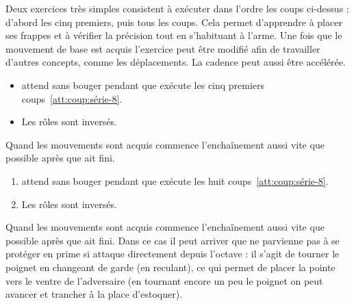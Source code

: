 Deux exercices très simples consistent à exécuter dans l'ordre les coups ci-dessus : d'abord les cinq premiers, puis tous les coups.
Cela permet d'apprendre à placer ses frappes et à vérifier la précision tout en s'habituant à l'arme.
Une fois que le mouvement de base est acquis l'exercice peut être modifié afin de travailler d'autres concepts, comme les déplacements.
La cadence peut aussi être accélérée.


\begin{exercice}
	\label{att:ex:série-5}


	\begin{itemize}
		\item \D attend sans bouger pendant que \A exécute les cinq premiers coups~\ref{att:coup:série-8}.
		
		\item Les rôles sont inversés.
	\end{itemize}

	Quand les mouvements sont acquis \D commence l'enchaînement aussi vite que possible après que \A ait fini.
\end{exercice}


\begin{exercice}
	\label{att:ex:série-8}


	\begin{enumerate}
		\item \D attend sans bouger pendant que \A exécute les huit coups~\ref{att:coup:série-8}.
		
		\item Les rôles sont inversés.
	\end{enumerate}

	Quand les mouvements sont acquis \D commence l'enchaînement aussi vite que possible après que \A ait fini.
	Dans ce cas il peut arriver que \A ne parvienne pas à se protéger en prime si \D attaque directement depuis l'octave : il s'agit de tourner le poignet en changeant de garde (en reculant), ce qui permet de placer la pointe vers le ventre de l'adversaire (en tournant encore un peu le poignet on peut avancer et trancher à la place d'estoquer).
\end{exercice}


